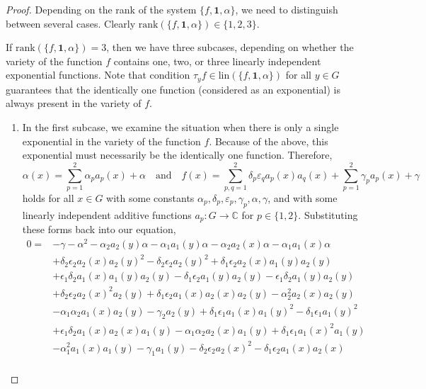 \documentclass[a4paper,12pt]{article}
\theoremstyle{plain}
\theoremstyle{definition}
\theoremstyle{remark}
\begin{document}
\begin{proof}
Depending on the rank of the system $\{f, \mathbf{1}, \alpha\}$, we need to distinguish between several cases. Clearly $\mathrm{rank}(\{f, \mathbf{1}, \alpha\})\in \{ 1, 2, 3\}$. 


If $\mathrm{rank}(\{f, \mathbf{1}, \alpha\})=3$, then we have three subcases, depending on whether the variety of the function $f$ contains one, two, or three linearly independent exponential functions. Note that condition 
$\tau_{y}f\in \mathrm{lin}(\{f, \mathbf{1}, \alpha\})$ for all $y\in G$ guarantees that the identically one function (considered as an exponential) is always present in the variety of $f$.
\begin{enumerate}[{Subcase} (i)]
\item In the first subcase, we examine the situation when there is only a single exponential in the variety of the function $f$. Because of the above, this exponential must necessarily be the identically one function. Therefore,
\[
 \alpha(x)= \sum_{p=1}^{2}\alpha_{p}a_{p}(x)+\alpha 
 \quad 
 \text{and}
 \quad 
 f(x)= \sum_{p, q=1}^{2}\delta_{p}\varepsilon_{q} a_{p}(x)a_{q}(x)+\sum_{p=1}^{2}\gamma_{p}a_{p}(x)+\gamma
\]
holds for all $x\in G$ with some constants $\alpha_{p}, \delta_{p}, \varepsilon_{p}, \gamma_{p}, \alpha, \gamma$, and with some linearly independent additive functions $a_{p}\colon G\to \mathbb{C}$ for $p\in \{ 1, 2\}$. 
Substituting these forms back into our equation, 
\begin{align*}
0= & -\gamma - \alpha^2 - \alpha_2 a_2(y) \alpha - \alpha_1 a_1(y) \alpha - \alpha_2 a_2(x) \alpha - \alpha_1 a_1(x) \alpha \\
& + \delta_2 \epsilon_2 a_2(x) a_2(y)^2 - \delta_2 \epsilon_2 a_2(y)^2 + \delta_1 \epsilon_2 a_2(x) a_1(y) a_2(y) \\
& + \epsilon_1 \delta_2 a_1(x) a_1(y) a_2(y) - \delta_1 \epsilon_2 a_1(y) a_2(y) - \epsilon_1 \delta_2 a_1(y) a_2(y) \\
& + \delta_2 \epsilon_2 a_2(x)^2 a_2(y) + \delta_1 \epsilon_2 a_1(x) a_2(x) a_2(y) - \alpha_2^2 a_2(x) a_2(y) \\
& - \alpha_1 \alpha_2 a_1(x) a_2(y) - \gamma_2 a_2(y) + \delta_1 \epsilon_1 a_1(x) a_1(y)^2 - \delta_1 \epsilon_1 a_1(y)^2 \\
& + \epsilon_1 \delta_2 a_1(x) a_2(x) a_1(y) - \alpha_1 \alpha_2 a_2(x) a_1(y) + \delta_1 \epsilon_1 a_1(x)^2 a_1(y) \\
& - \alpha_1^2 a_1(x) a_1(y) - \gamma_1 a_1(y) - \delta_2 \epsilon_2 a_2(x)^2 - \delta_1 \epsilon_2 a_1(x) a_2(x) \\

\end{align*}
\end{enumerate}
\end{proof}
\end{document}
